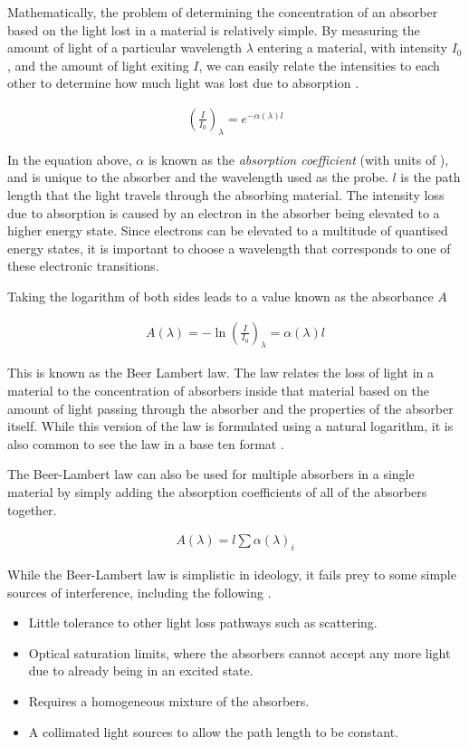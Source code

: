 Mathematically, the problem of determining the concentration of an absorber
based on the light lost in a material is relatively simple. By measuring the
amount of light of a particular wavelength $\lambda$ entering a material, with
intensity $I_0$, and the amount of light exiting $I$, we can easily relate the
intensities to each other to determine how much light was lost due to
absorption \cite{Hollas:2004uh}.

\begin{align*}
  \left(\frac{I}{I_0}\right)_\lambda = e^{-\alpha(\lambda)l}
\end{align*}

In the equation above, $\alpha$ is known as the \emph{absorption coefficient}
(with units of \icm), and is unique to the absorber and the wavelength
used as the probe. $l$ is the path length that the light travels through the
absorbing material. The intensity loss due to absorption is caused by an
electron in the absorber being elevated to a higher energy state. Since
electrons can be elevated to a multitude of quantised energy states, it is
important to choose a wavelength that corresponds to one of these electronic
transitions.

Taking the logarithm of both sides leads to a value known as the absorbance $A$

\begin{align}
  A(\lambda)=-\ln\left(\frac{I}{I_0}\right)_\lambda = \alpha(\lambda)l\label{eq:beer}
\end{align}

This is known as the Beer Lambert law. The law relates the loss of light in a
material to the concentration of absorbers inside that material based on the
amount of light passing through the absorber and the properties of the absorber
itself.  While this version of the  law is formulated using a natural logarithm, it is also common to see the law in a base ten format \cite{Hollas:2004uh}.

The Beer-Lambert law can also be used for multiple absorbers in a single material by simply adding the absorption coefficients of all of the absorbers together.

\begin{align*}
  A(\lambda) = l\sum\alpha(\lambda)_i
\end{align*}

While the Beer-Lambert law is simplistic in ideology, it fails prey to some simple sources of interference, including the following \cite{Skoog:1994wg}.
\begin{itemize}
  \item Little tolerance to other light loss pathways such as scattering.
  \item Optical saturation limits, where the absorbers cannot accept any more light due to already being in an excited state.
  \item Requires a homogeneous mixture of the absorbers.
  \item A collimated light sources to allow the path length to be constant.
\end{itemize}

